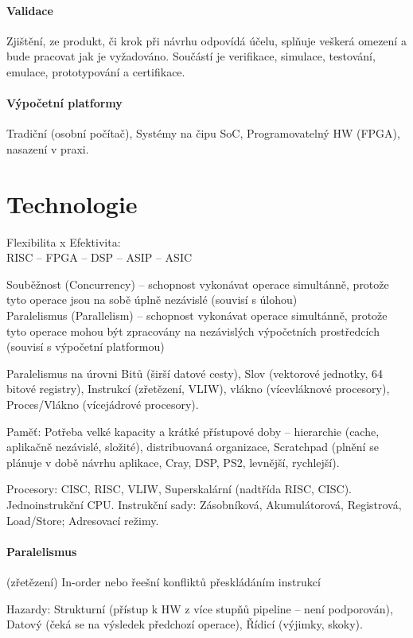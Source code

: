\documentclass[a4paper, 11pt]{report}
\begin{document}
\paragraph{Validace}
Zjištění, ze produkt, či krok při návrhu odpovídá účelu, splňuje veškerá omezení a bude pracovat jak je vyžadováno. Součástí je verifikace, simulace, testování, emulace, prototypování a certifikace.

\paragraph{Výpočetní platformy}
Tradiční (osobní počítač), Systémy na čipu SoC, Programovatelný HW (FPGA), nasazení v praxi.

\section{Technologie}

Flexibilita x Efektivita:\\
RISC -- FPGA -- DSP -- ASIP -- ASIC

Souběžnost (Concurrency) -- schopnost vykonávat operace simultánně, protože tyto operace jsou na sobě úplně nezávislé (souvisí s úlohou)\\
Paralelismus (Parallelism) -- schopnost vykonávat operace simultánně, protože tyto operace mohou být zpracovány na nezávislých výpočetních prostředcích (souvisí s výpočetní platformou)

Paralelismus na úrovni Bitů (širší datové cesty), Slov (vektorové jednotky, 64 bitové registry), Instrukcí (zřetězení, VLIW), vlákno (vícevláknové procesory), Proces/Vlákno (vícejádrové procesory).

Paměť: Potřeba velké kapacity a krátké přístupové doby -- hierarchie (cache, aplikačně nezávislé, složité), distribuovaná organizace, Scratchpad (plnění se plánuje v době návrhu aplikace, Cray, DSP, PS2, levnější, rychlejší).

Procesory: CISC, RISC, VLIW, Superskalární (nadtřída RISC, CISC). Jednoinstrukční CPU.
Instrukční sady: Zásobníková, Akumulátorová, Registrová, Load/Store; Adresovací režimy.

\paragraph{Paralelismus} (zřetězení)
In-order nebo řeešní konfliktů přeskládáním instrukcí

Hazardy: Strukturní (přístup k HW z více stupňů pipeline -- není podporován), Datový (čeká se na výsledek předchozí operace), Řídicí (výjimky, skoky).
\end{document}

